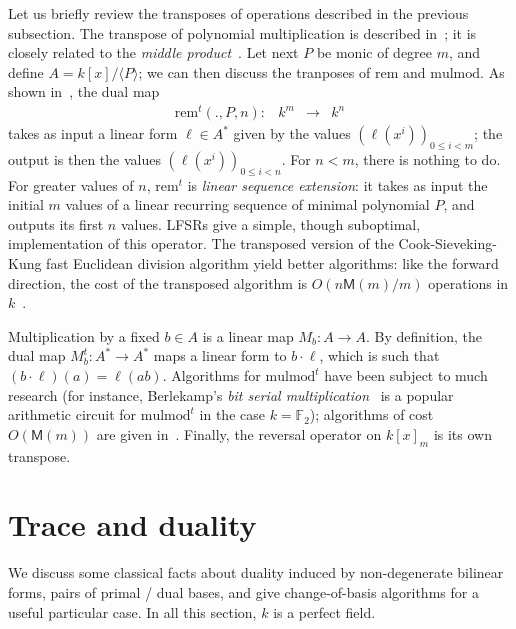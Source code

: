\documentclass{sig-alternate}
\def\M {\ensuremath{\mathsf{M}}}
\def\F {\ensuremath{\mathbb{F}}}
\def\rem {\ensuremath{\mathrm{rem}}}
\def\mulmod {\ensuremath{\mathrm{mulmod}}}
\newcounter{algo}
\newcommand{\ang}[1]{\langle#1\rangle}
\begin{document}
Let us briefly review the transposes of operations described in the
previous subsection. The transpose of polynomial multiplication is
described in~\cite{bostan+lecerf+schost:tellegen}; it is closely
related to the {\em middle product}~\cite{hanrot+quercia+zimmermann}.
Let next $P$ be monic of degree $m$, and define $A=k[x]/\ang{P}$; we
can then discuss the tranposes of $\rem$ and $\mulmod$. As shown
in~\cite{bostan+lecerf+schost:tellegen}, the dual map
$$
\begin{array}{cccc}
\rem^t(.,P,n): &k^m& \to &k^n
\end{array}$$ 
takes as input a linear form $\ell\in A^\ast$ given by the values
$(\ell(x^i))_{0 \le i < m}$; the output is then the values
$(\ell(x^i))_{0 \le i < n}$. For $n < m$, there is nothing to do. For
greater values of $n$, $\rem^t$ is \emph{linear sequence extension}:
it takes as input the initial $m$ values of a linear recurring
sequence of minimal polynomial $P$, and outputs its first $n$ values.
LFSRs give a simple, though suboptimal, implementation of this
operator. The transposed version of the Cook-Sieveking-Kung fast
Euclidean division algorithm yield better algorithms: like the
forward direction, the cost of the transposed algorithm is
$O(n\M(m)/m)$ operations in $k$~\cite{vzgathen+shoup92:journal,shoup99}.

Multiplication by a fixed $b\in A$ is a linear map $M_b:A\to A$. By
definition, the dual map $M_b^t: A^* \to A^*$ maps a linear form to $b
\cdot \ell$, which is such that $(b \cdot \ell)(a)
=\ell(ab)$. Algorithms for $\mulmod^t$ have been subject to much
research (for instance, Berlekamp's \emph{bit serial
  multiplication}~\cite{Berlekamp82} is a popular arithmetic circuit
for $\mulmod^t$ in the case $k=\F_2$); algorithms of cost $O(\M(m))$
are given in~\cite{shoup99,bostan+lecerf+schost:tellegen}. Finally,
the reversal operator on $k[x]_m$ is its own transpose.


\section{Trace and duality}

We discuss some classical facts about duality induced by
non-degenerate bilinear forms, pairs of primal / dual bases, and give
change-of-basis algorithms for a useful particular case. In all this
section, $k$ is a perfect field.
\end{document}
